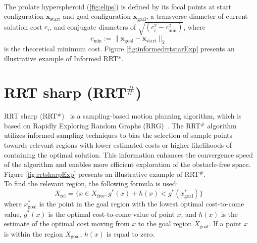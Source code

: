 \documentclass{ctuthesis}
\begin{document}
\\[12pt]
The prolate hyperspheroid (\ref{fig:elips}) is defined by its focal points 
at start configuration \( \textbf{x}_{\text{start}} \) and goal configuration 
\( \textbf{x}_{\text{goal}} \), a transverse diameter of current solution cost \( c_i \), 
and conjugate diameters of \(\sqrt{( c_i^2 - c_{\text{min}}^2)} \), 
where \[ c_{\text{min}} := \| \textbf{x}_{\text{goal}} - \textbf{x}_{\text{start}} \|_2 \]
is the theoretical minimum cost. 
Figure \ref{fig:informedrrtstarExp} presents an illustrative example of Informed RRT*.
\section{\texorpdfstring{RRT sharp (RRT$^\#$)}{Title without Superscript}}
RRT sharp (RRT$^\#$)~\cite{arslan2012rrtsharp} is a sampling-based motion planning algorithm, 
which is based on Rapidly Exploring Random Graphs (RRG)~\cite{Karaman2009RRG}. 
The RRT$^\#$ algorithm utilizes informed sampling techniques to bias the selection of sample 
points towards relevant regions with lower estimated costs or higher likelihoods of containing the optimal solution. 
This information enhances the convergence speed of the algorithm and 
enables more efficient exploration of the obstacle-free space.
Figure \ref{fig:rrtsharpExp} presents an illustrative example of RRT$^\#$.
\\[12pt]
To find the relevant region, the following formula is used:
\[
X_{\text{rel}} = \{ x \in X_{\text{free}} : g^*(x) + h(x) < g^*(x^*_{\text{goal}}) \}
\]
where \( x^*_{\text{goal}} \) is the point in the goal 
region with the lowest optimal cost-to-come value, 
\( g^*(x) \) is the optimal cost-to-come value of 
point \( x \), and \( h(x) \) is the estimate of the 
optimal cost moving from \( x \) to the goal region \( X_{\text{goal}} \).
If a point \( x \) is within the region \( X_{\text{goal}} \), \( h(x) \) is equal to zero.
\end{document}
